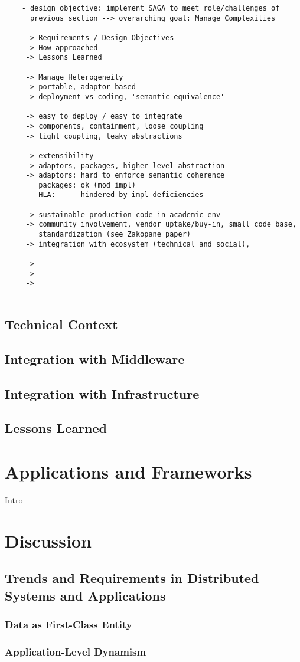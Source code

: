 \documentclass[a4paper,10pt]{article}
\begin{document}
  \begin{verbatim}
    - design objective: implement SAGA to meet role/challenges of
      previous section --> overarching goal: Manage Complexities
  
     -> Requirements / Design Objectives
     -> How approached
     -> Lessons Learned
  
     -> Manage Heterogeneity
     -> portable, adaptor based
     -> deployment vs coding, 'semantic equivalence'
  
     -> easy to deploy / easy to integrate
     -> components, containment, loose coupling
     -> tight coupling, leaky abstractions
  
     -> extensibility
     -> adaptors, packages, higher level abstraction
     -> adaptors: hard to enforce semantic coherence
        packages: ok (mod impl)
        HLA:      hindered by impl deficiencies
  
     -> sustainable production code in academic env
     -> community involvement, vendor uptake/buy-in, small code base,
        standardization (see Zakopane paper)
     -> integration with ecosystem (technical and social), 
  
     ->
     -> 
     ->
  
  \end{verbatim}

\subsection{Technical Context}

\subsection{Integration with Middleware}

\subsection{Integration with Infrastructure}

\subsection{Lessons Learned}

\section{Applications and Frameworks}
\label{apps_and_frameworks}

Intro

\section{Discussion}

\subsection{Trends and Requirements in Distributed Systems and Applications}

\subsubsection{Data as First-Class Entity}

\subsubsection{Application-Level Dynamism}

 

\end{document}
